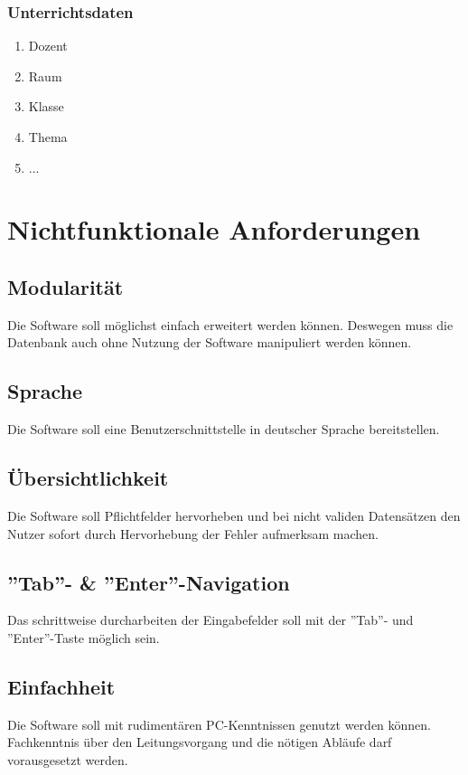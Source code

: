 \documentclass[a4paper]{scrartcl}
\begin{document}
	\subsubsection{Unterrichtsdaten}
		\begin{enumerate}
			\item Dozent
			\item Raum
			\item Klasse
			\item Thema
			\item ...
		\end{enumerate}
	
\pagebreak
\eject
	
\section{Nichtfunktionale Anforderungen}
	\subsection{Modularität}
	Die Software soll möglichst einfach erweitert werden können. Deswegen muss die Datenbank auch ohne Nutzung der Software manipuliert werden können.
	
	\subsection{Sprache}
	Die Software soll eine Benutzerschnittstelle in deutscher Sprache bereitstellen.
	
	\subsection{Übersichtlichkeit}
	Die Software soll Pflichtfelder hervorheben und bei nicht validen Datensätzen den Nutzer sofort durch Hervorhebung der Fehler aufmerksam machen.
	
	\subsection{''Tab''- \& ''Enter''-Navigation}
	Das schrittweise durcharbeiten der Eingabefelder soll mit der ''Tab''- und ''Enter''-Taste möglich sein.
	
	\subsection{Einfachheit}
	Die Software soll mit rudimentären PC-Kenntnissen genutzt werden können. Fachkenntnis über den Leitungsvorgang und die nötigen Abläufe darf vorausgesetzt werden.
	
\end{document}
